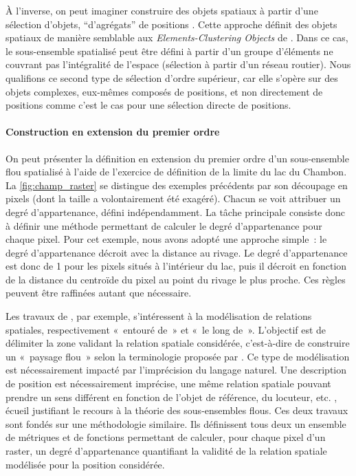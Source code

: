 À l’inverse, on peut imaginer construire des objets spatiaux à partir
d’une sélection d’objets, \enquote{d’agrégats} de positions
\autocite{Charrre1995}. Cette approche définit des objets spatiaux de
manière semblable aux \emph{Elements-Clustering Objects} de
\textcite{Liu2019}. Dans ce cas, le sous-ensemble spatialisé peut être
défini à partir d’un groupe d’éléments ne couvrant pas l’intégralité
de l’espace (\eg sélection à partir d’un réseau routier). Nous
qualifions ce second type de sélection d’ordre supérieur, car elle
s’opère sur des objets complexes, eux-mêmes composés de positions, et
non directement de positions comme c’est le cas pour une sélection
directe de positions.

\paragraph{Construction en extension du premier ordre}

On peut présenter la définition en extension du premier ordre d’un
sous-ensemble flou spatialisé à l’aide de l’exercice de définition de
la limite du lac du Chambon. La \autoref{fig:champ_raster} se
distingue des exemples précédents par son découpage en pixels (dont la
taille a volontairement été exagéré). Chacun se voit attribuer un
degré d’appartenance, défini indépendamment. La tâche principale
consiste donc à définir une méthode permettant de calculer le degré
d’appartenance pour chaque pixel. Pour cet exemple, nous avons adopté
une approche simple : le degré d’appartenance décroit avec la distance
au rivage. Le degré d’appartenance est donc de 1 pour les pixels
situés à l’intérieur du lac, puis il décroit en fonction de la
distance du centroïde du pixel au point du rivage le plus proche. Ces
règles peuvent être raffinées autant que nécessaire.

Les travaux de \textcite{Vanegass2011,Takemura2012}, par exemple,
s’intéressent à la modélisation de relations spatiales, respectivement
« entouré de » et « le long de ». L’objectif est de délimiter la zone
validant la relation spatiale considérée, c’est-à-dire de construire
un « paysage flou » selon la terminologie proposée par
\textcite{Bloch1996}. Ce type de modélisation est nécessairement
impacté par l’imprécision du langage naturel. Une description de
position est nécessairement imprécise, une même relation spatiale
pouvant prendre un sens différent en fonction de l’objet de référence,
du locuteur, etc. \autocite{Vandeloise1986,Borillo1998,Bateman2010},
écueil justifiant le recours à la théorie des sous-ensembles
flous. Ces deux travaux sont fondés sur une méthodologie
similaire. Ils définissent tous deux un ensemble de métriques et de
fonctions permettant de calculer, pour chaque pixel d’un raster, un
degré d’appartenance quantifiant la validité de la relation spatiale
modélisée pour la position considérée.

